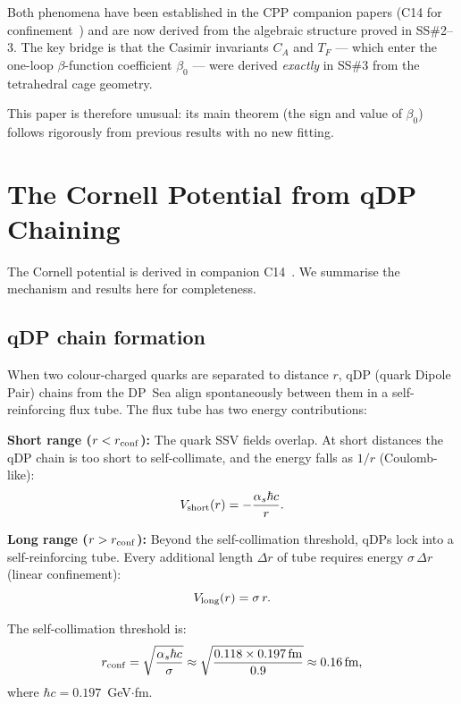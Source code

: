 \documentclass[11pt,a4paper]{article}
\newcommand{\as}{\alpha_s}
\begin{document}
Both phenomena have been established in the CPP companion papers
(C14 for confinement~\citep{c14}) and are now derived from the
algebraic structure proved in SS\#2--3.  The key bridge is that
the Casimir invariants $C_A$ and $T_F$ --- which enter the
one-loop $\beta$-function coefficient $\beta_0$ --- were derived
\emph{exactly} in SS\#3 from the tetrahedral cage geometry.

This paper is therefore unusual: its main theorem (the sign and
value of $\beta_0$) follows rigorously from previous results
with no new fitting.

\section{The Cornell Potential from qDP Chaining}
\label{sec:cornell}

The Cornell potential is derived in companion C14~\citep{c14}.
We summarise the mechanism and results here for completeness.

\subsection{qDP chain formation}

When two colour-charged quarks are separated to distance $r$, qDP
(quark Dipole Pair) chains from the DP~Sea align spontaneously
between them in a self-reinforcing flux tube.  The flux tube has
two energy contributions:

\textbf{Short range ($r < r_{\rm conf}$):} The quark SSV fields
overlap.  At short distances the qDP chain is too short to
self-collimate, and the energy falls as $1/r$ (Coulomb-like):
\begin{equation}
V_{\rm short}(r) = -\frac{\as\hbar c}{r}.
\label{eq:vcoulomb}
\end{equation}

\textbf{Long range ($r > r_{\rm conf}$):} Beyond the
self-collimation threshold, qDPs lock into a self-reinforcing
tube.  Every additional length $\Delta r$ of tube requires energy
$\sigma\,\Delta r$ (linear confinement):
\begin{equation}
V_{\rm long}(r) = \sigma\,r.
\label{eq:vlinear}
\end{equation}

The self-collimation threshold is:
\begin{equation}
r_{\rm conf} = \sqrt{\frac{\as\hbar c}{\sigma}}
\approx \sqrt{\frac{0.118 \times 0.197\,\text{fm}}{0.9}} \approx 0.16\,\text{fm},
\label{eq:rconf}
\end{equation}
where $\hbar c = 0.197$~GeV$\cdot$fm.
\end{document}
